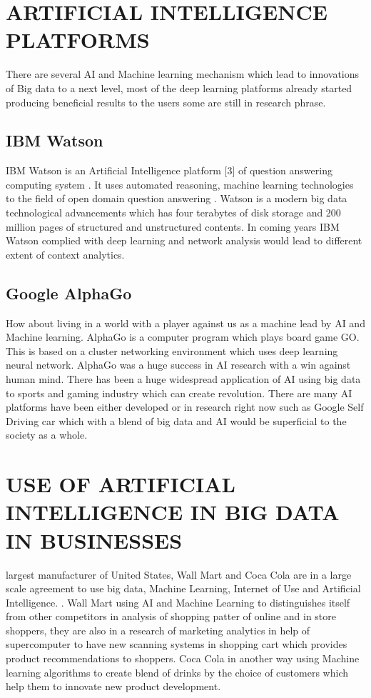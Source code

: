 \documentclass[sigconf]{acmart}
\begin{document}
\section{ARTIFICIAL INTELLIGENCE PLATFORMS}
There are several AI and Machine learning mechanism which lead to innovations of Big data to a next level, most of the deep learning platforms already started producing beneficial results to the users some are still in research phrase. \cite{editor03}

\subsection{IBM Watson}
IBM Watson is an Artificial Intelligence platform [3] of question answering computing system \cite{editor04}.  It uses automated reasoning, machine learning technologies to the field of open domain question answering \cite{editor04}. Watson is a modern big data technological advancements which has four terabytes of disk storage and 200 million pages of structured and unstructured contents. In coming years IBM Watson complied with deep learning and network analysis would lead to different extent of context analytics.

\subsection{Google AlphaGo}
How about living in a world with a player against us as a machine lead by AI and Machine learning. AlphaGo is a computer program which plays board game GO. This is based on a cluster networking environment which uses deep learning neural network. AlphaGo was a huge success in AI research with a win against human mind. There has been a huge widespread application of AI using big data to sports and gaming industry which can create revolution. There are many AI platforms have been either developed or in research right now such as Google Self Driving car which with a blend of big data and AI would be superficial to the society as a whole. \cite{editor04}

\section{USE OF ARTIFICIAL INTELLIGENCE IN BIG DATA IN BUSINESSES }
largest manufacturer of United States, Wall Mart and Coca Cola are in a large scale agreement to use big data, Machine Learning, Internet of Use and Artificial Intelligence. \cite{editor05}. Wall Mart using AI and Machine Learning to distinguishes itself from other competitors in analysis of shopping patter of online and in store shoppers, they are also in a research of marketing analytics in help of supercomputer to have new scanning systems in shopping cart which provides product recommendations to shoppers. Coca Cola in another way using Machine learning algorithms to create blend of drinks by the choice of customers which help them to innovate new product development. 
\end{document}
